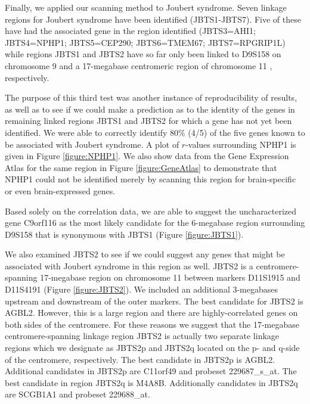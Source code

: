\documentclass{bioinfo}
\begin{document}
Finally, we applied our scanning method to Joubert syndrome.  Seven linkage
regions for Joubert syndrome have been identified (JBTS1-JBTS7).  Five of
these have had the associated gene in the region identified (JBTS3=AHI1;
JBTS4=NPHP1; JBTS5=CEP290; JBTS6=TMEM67; JBTS7=RPGRIP1L)
\cite{JBTS3,JBTS4,JBTS5,JBTS6,JBTS7} while regions JBTS1 and JBTS2 have so far
only been linked to D9S158 \cite{JBTS1} on chromosome 9 and a 17-megabase
centromeric region of chromosome 11 \cite{JBTS2A,JBTS2B,JBTS2C}, respectively.

The purpose of this third test was another instance of reproducibility of
results, as well as to see if we could make a prediction as to the identity of
the genes in remaining linked regions JBTS1 and JBTS2 for which a gene has not
yet been identified.  We were able to correctly identify 80\% (4/5) of the five
genes known to be associated with Joubert syndrome.  A plot of $r$-values
surrounding NPHP1 is given in Figure \ref{figure:NPHP1}.  We also show data from the
Gene Expression Atlas \cite{GNF} for the same region in Figure \ref{figure:GeneAtlas}
to demonstrate that NPHP1 could not be identified merely by scanning this
region for brain-specific or even brain-expressed genes.

Based solely on the correlation data, we are able to suggest the
uncharacterized gene C9orf116 as the most likely candidate for the 6-megabase
region surrounding D9S158 that is synonymous with JBTS1 (Figure
\ref{figure:JBTS1}).

We also examined JBTS2 to see if we could suggest any genes that might be
associated with Joubert syndrome in this region as well.  JBTS2 is a
centromere-spanning 17-megabase region on chromosome 11 between markers
D11S1915 and D11S4191 (Figure \ref{figure:JBTS2}).  We included an additional
3-megabases upstream and downstream of the outer markers.  The best candidate
for JBTS2 is AGBL2.  However, this is a large region and there are
highly-correlated genes on both sides of the centromere.  For these reasons we
suggest that the 17-megabase centromere-spanning linkage region JBTS2 is
actually two separate linkage regions which we designate as JBTS2p and JBTS2q
located on the p- and q-side of the centromere, respectively.  The best
candidate in JBTS2p is AGBL2.  Additional candidates in JBTS2p are C11orf49 and
probeset 229687\_s\_at.  The best candidate in region JBTS2q is M4A8B.
Additionally candidates in JBTS2q are SCGB1A1 and probeset 229688\_at.

\end{document}
